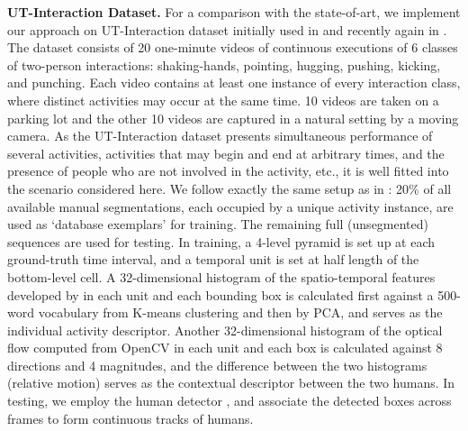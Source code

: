 \noindent\textbf{UT-Interaction Dataset.} For a comparison with the state-of-art, we implement our approach on UT-Interaction dataset initially used in \cite{Ryoo:group} and recently again in \cite{Amer:group}. The dataset consists of 20 one-minute videos of continuous executions of 6 classes of two-person interactions: shaking-hands, pointing, hugging, pushing, kicking, and punching. Each video contains at least one instance of every interaction class, where distinct activities may occur at the same time. 10 videos are taken on a parking lot and the other 10 videos are captured in a natural setting by a moving camera. As the UT-Interaction dataset presents simultaneous performance of several activities, activities that may begin and end at arbitrary times, and the presence of people who are not involved in the activity, etc., it is well fitted into the scenario considered here. We follow exactly the same setup as in \cite{Ryoo:group,Amer:group}: 20\% of all available manual segmentations, each occupied by a unique activity instance, are used as `database exemplars' for training. The remaining full (unsegmented) sequences are used for testing. In training, a 4-level pyramid is set up at each ground-truth time interval, and a temporal unit is set at half length of the bottom-level cell. A 32-dimensional histogram of the spatio-temporal features developed by \cite{Dollar:STIP} in each unit and each bounding box is calculated first against a 500-word vocabulary from K-means clustering and then by PCA, and serves as the individual activity descriptor. Another 32-dimensional histogram of the optical flow computed from OpenCV in each unit and each box is calculated against 8 directions and 4 magnitudes, and the difference between the two histograms (relative motion) serves as the contextual descriptor between the two humans. In testing, we employ the human detector \cite{Pedro:detect}, and associate the detected boxes across frames to form continuous tracks of humans. 

